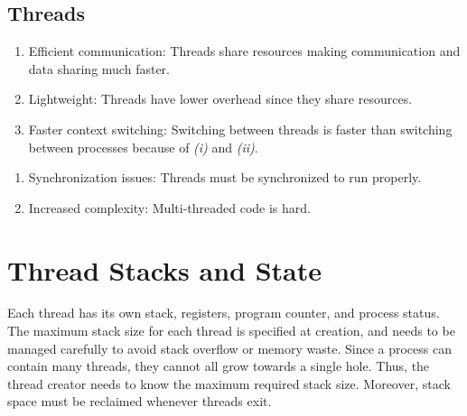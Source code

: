 \documentclass{report}
\begin{document}
\subsection*{Threads}
\begin{tcbraster}[raster columns=2, raster equal height, raster force size=false]
  \begin{tcolorbox}[colback=green!5!white,colframe=black!75!green,title=Advantages]
    \begin{enumerate}[label=\textit{(\roman*)}]
    \item Efficient communication: Threads share resources making communication and data sharing
      much faster.
    \item Lightweight: Threads have lower overhead since they share resources.
    \item Faster context switching: Switching between threads is faster than switching between
      processes because of \textit{(i)} and \textit{(ii)}.
    \end{enumerate}
  \end{tcolorbox}
  \begin{tcolorbox}[colback=red!5!white,colframe=black!40!red,title=Disadvantages]
    \begin{enumerate}[label=\textit{(\roman*)}]
    \item Synchronization issues: Threads must be synchronized to run properly.
    \item Increased complexity: Multi-threaded code is hard.
    \end{enumerate}
  \end{tcolorbox}
\end{tcbraster}


\section{Thread Stacks and State}
Each thread has its own stack, registers, program counter, and process status. The maximum stack size for
each thread is specified at creation, and needs to be managed carefully to avoid stack overflow or
memory waste. Since a process can contain many threads, they cannot all grow towards a single
hole. Thus, the thread creator needs to know the maximum required stack size. Moreover, stack space
must be reclaimed whenever threads exit.
\end{document}
